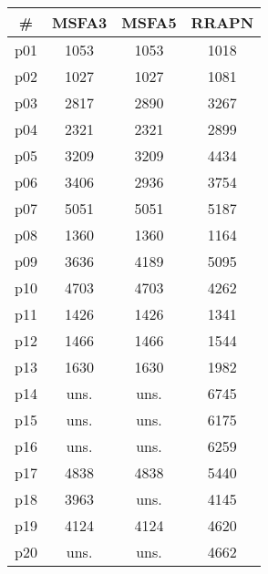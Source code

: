 \begin{tabular}{c||c|c|c}
\textbf{\#} & \textbf{MSFA3} & \textbf{MSFA5} & \textbf{RRAPN}\\
\hline
\hline
p01 & 1053 & 1053 & 1018\\
p02 & 1027 & 1027 & 1081\\
p03 & 2817 & 2890 & 3267\\
p04 & 2321 & 2321 & 2899\\
p05 & 3209 & 3209 & 4434\\
p06 & 3406 & 2936 & 3754\\
p07 & 5051 & 5051 & 5187\\
p08 & 1360 & 1360 & 1164\\
p09 & 3636 & 4189 & 5095\\
p10 & 4703 & 4703 & 4262\\
p11 & 1426 & 1426 & 1341\\
p12 & 1466 & 1466 & 1544\\
p13 & 1630 & 1630 & 1982\\
p14 & uns. & uns. & 6745\\
p15 & uns. & uns. & 6175\\
p16 & uns. & uns. & 6259\\
p17 & 4838 & 4838 & 5440\\
p18 & 3963 & uns. & 4145\\
p19 & 4124 & 4124 & 4620\\
p20 & uns. & uns. & 4662\\
\end{tabular}

